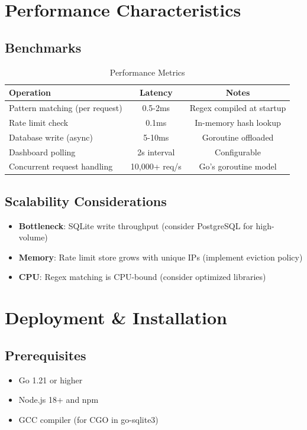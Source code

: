 \documentclass[11pt,a4paper]{report}
\begin{document}
\chapter{Performance Characteristics}

\section{Benchmarks}

\begin{table}[H]
\centering
\begin{tabular}{@{}lcc@{}}
\toprule
\textbf{Operation} & \textbf{Latency} & \textbf{Notes} \\ \midrule
Pattern matching (per request) & 0.5-2ms & Regex compiled at startup \\
Rate limit check & 0.1ms & In-memory hash lookup \\
Database write (async) & 5-10ms & Goroutine offloaded \\
Dashboard polling & 2s interval & Configurable \\
Concurrent request handling & 10,000+ req/s & Go's goroutine model \\ \bottomrule
\end{tabular}
\caption{Performance Metrics}
\end{table}

\section{Scalability Considerations}
\begin{itemize}
    \item \textbf{Bottleneck}: SQLite write throughput (consider PostgreSQL for high-volume)
    \item \textbf{Memory}: Rate limit store grows with unique IPs (implement eviction policy)
    \item \textbf{CPU}: Regex matching is CPU-bound (consider optimized libraries)
\end{itemize}

\chapter{Deployment \& Installation}

\section{Prerequisites}
\begin{itemize}
    \item Go 1.21 or higher
    \item Node.js 18+ and npm
    \item GCC compiler (for CGO in go-sqlite3)
\end{itemize}
\end{document}
